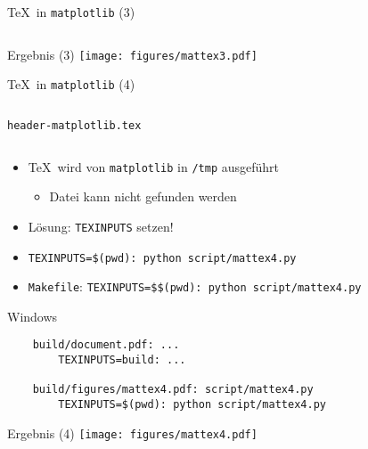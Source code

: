 \begin{frame}[fragile]{\TeX\ in \texttt{matplotlib} (3)}
  \inputminted{python}{script/mattex3.py}
\end{frame}

\AddToShipoutPictureFG*{\ShowFramePicture}
\begin{frame}{Ergebnis (3)}%
  \centering%
  \texttt{[image: figures/mattex3.pdf]}%
\end{frame}

\begin{frame}[fragile]{\TeX\ in \texttt{matplotlib} (4)}
  \inputminted{python}{script/mattex4.py}
\end{frame}

\begin{frame}[fragile]{\texttt{header-matplotlib.tex}}
  \inputminted{latex}{header-matplotlib.tex}

  \vspace*{-0.5em}
  \begin{itemize}
    \item \TeX\ wird von \texttt{matplotlib} in \texttt{/tmp} ausgeführt
      \begin{itemize}
        \item Datei kann nicht gefunden werden
      \end{itemize}
    \item Lösung: \texttt{TEXINPUTS} setzen!
    \item \texttt{TEXINPUTS=\$(pwd): python script/mattex4.py}
    \item \texttt{Makefile}: \texttt{TEXINPUTS=\$\$(pwd): python script/mattex4.py}
  \end{itemize}
  \vspace*{-1em}
\end{frame}

\begin{frame}[fragile]{Windows}
  \begin{verbatim}
    build/document.pdf: ...
        TEXINPUTS=build: ...

    build/figures/mattex4.pdf: script/mattex4.py
        TEXINPUTS=$(pwd): python script/mattex4.py
  \end{verbatim}
\end{frame}

\AddToShipoutPictureFG*{\ShowFramePicture}
\begin{frame}{Ergebnis (4)}
  \centering
  \texttt{[image: figures/mattex4.pdf]}
\end{frame}

